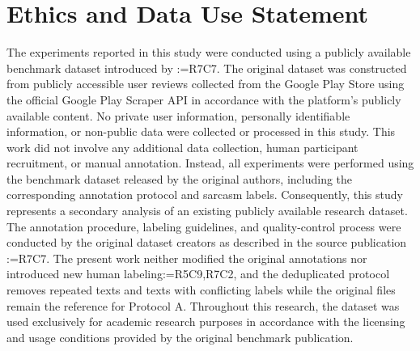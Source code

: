 \documentclass[a4paper,fleqn]{cas-sc}
\makeatletter
\newif\iftracked
\newcommand{\rv@setcolour}[1]{%
  \IfStrEq{#1}{R7C7}{\color{rvEdit}}{%
    \IfSubStr{#1}{R5}{\IfSubStr{#1}{R7}{\color{rvBoth}}{\color{rvFive}}}{\color{rvSeven}}}}
\newcommand{\rv@tag}[1]{\textsuperscript{\sffamily\bfseries\scriptsize[\StrSubstitute{#1}{,}{, }]}\,}
\newcommand{\rv@recordone}[1]{%
  \edef\rv@i{#1}%
  \ifcsdef{rv@n@\rv@i}{}{\csgdef{rv@n@\rv@i}{0}}%
  \csxdef{rv@n@\rv@i}{\the\numexpr\csuse{rv@n@\rv@i}+1\relax}%
  \begingroup\edef\@currentlabel{\rv@i}\label{rv:\rv@i:\csuse{rv@n@\rv@i}}\endgroup}
\newcommand{\rv@record}[1]{\@for\rv@id:=#1\do{\expandafter\rv@recordone\expandafter{\rv@id}}}
\DeclareRobustCommand{\rc}[2]{\rv@record{#1}\iftracked{\rv@setcolour{#1}\rv@tag{#1}#2}\else#2\fi}
\DeclareRobustCommand{\rcrep}[3]{\rv@record{#1}\iftracked{\rv@setcolour{#1}\rv@tag{#1}\rv@strike{#2} #3}\else#3\fi}
\DeclareRobustCommand{\rce}[1]{\rv@record{R7C7}\iftracked{\color{rvEdit}#1}\else#1\fi}
\makeatother
\begin{document}
\section{Ethics and Data Use Statement}
\label{sec:ethics-data}
The experiments reported in this study were conducted using a publicly available benchmark dataset introduced by \rcrep{R7C7}{Fatima et al. Fatima et al. (2024)}{\citet{fatima2024exploratory}}. The original dataset was constructed from publicly accessible user reviews collected from the Google Play Store using the official Google Play Scraper API in accordance with the platform's publicly available content. No private user information, personally identifiable information, or non-public data were collected or processed in this study. This work did not involve any additional data collection, human participant recruitment, or manual annotation. Instead, all experiments were performed using the benchmark dataset released by the original authors, including the corresponding annotation protocol and sarcasm labels. Consequently, this study represents a secondary analysis of an existing publicly available research dataset. The annotation procedure, labeling guidelines, and quality-control process were conducted by the original dataset creators as described in the source publication \rce{\citep{fatima2024exploratory}}. The present work neither modified the original annotations nor introduced new human labeling\rc{R5C9,R7C2}{, and the deduplicated protocol removes repeated texts and texts with conflicting labels while the original files remain the reference for Protocol A}. Throughout this research, the dataset was used exclusively for academic research purposes in accordance with the licensing and usage conditions provided by the original benchmark publication.
\end{document}
